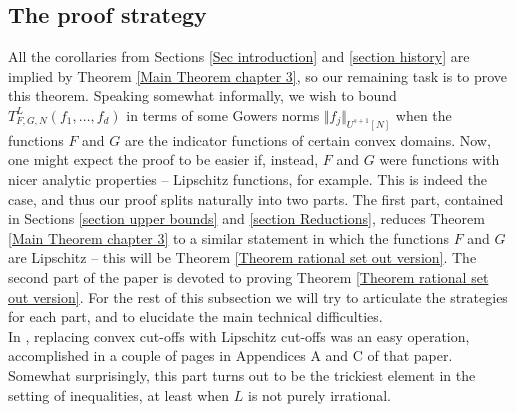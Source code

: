 \documentclass[12pt,a4paper,twoside,reqno]{amsart}
\numberwithin{equation}{section}
\begin{document}
\subsection{The proof strategy}
\label{Section proof strategy}
All the corollaries from Sections \ref{Sec introduction} and \ref{section history} are implied by Theorem \ref{Main Theorem chapter 3}, so our remaining task is to prove this theorem. Speaking somewhat informally, we wish to bound $T_{F,G,N}^L(f_1,\dots,f_d)$ in terms of some Gowers norms $\Vert f_j\Vert_{U^{s+1}[N]}$ when the functions $F$ and $G$ are the indicator functions of certain convex domains. Now, one might expect the proof to be easier if, instead, $F$ and $G$ were functions with nicer analytic properties -- Lipschitz functions, for example. This is indeed the case, and thus our proof splits naturally into two parts. The first part, contained in Sections \ref{section upper bounds} and \ref{section Reductions}, reduces Theorem \ref{Main Theorem chapter 3} to a similar statement in which the functions $F$ and $G$ are Lipschitz -- this will be Theorem \ref{Theorem rational set out version}. The second part of the paper is devoted to proving Theorem \ref{Theorem rational set out version}. For the rest of this subsection we will try to articulate the strategies for each part, and to elucidate the main technical difficulties. \\

In \cite{GT10}, replacing convex cut-offs with Lipschitz cut-offs was an easy operation, accomplished in a couple of pages in Appendices A and C of that paper. Somewhat surprisingly, this part turns out to be the trickiest element in the setting of inequalities, at least when $L$ is not purely irrational. 
\end{document}
